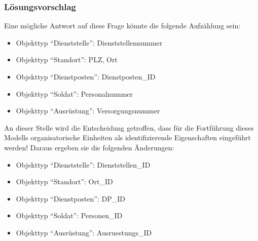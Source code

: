 \subsubsection{Lösungsvorschlag}
Eine mögliche Antwort auf diese Frage könnte die folgende Aufzählung sein:
\begin{itemize}
    \item Objekttyp \enquote{Dienststelle}: Dienststellennummer
    \item Objekttyp \enquote{Standort}: PLZ, Ort
    \item Objekttyp \enquote{Dienstposten}: Dienstposten\_ID
    \item Objekttyp \enquote{Soldat}: Personalnummer
    \item Objekttyp \enquote{Ausrüstung}: Versorgungsnummer
\end{itemize}
An dieser Stelle wird die Entscheidung getroffen, dass für die Fortführung dieses Modells organisatorische Einheiten als identifizierende Eigenschaften eingeführt werden! Daraus ergeben sie die folgenden Änderungen:
\begin{itemize}
    \item Objekttyp \enquote{Dienststelle}: Dienststellen\_ID
    \item Objekttyp \enquote{Standort}: Ort\_ID
    \item Objekttyp \enquote{Dienstposten}: DP\_ID
    \item Objekttyp \enquote{Soldat}: Personen\_ID
    \item Objekttyp \enquote{Ausrüstung}: Ausruestungs\_ID
\end{itemize}

